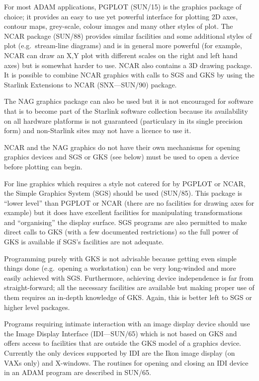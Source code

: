 For most ADAM applications, PGPLOT (SUN/15) is the graphics package of choice;
it provides an easy to use yet powerful interface for plotting 2D axes, contour 
maps, grey-scale, colour images and many other styles of plot. The NCAR
package (SUN/88) provides similar facilities and some additional styles of plot
(e.g.\ stream-line diagrams) and is in general more powerful (for example, NCAR
can draw an X,Y plot with different scales on the right and left hand axes) but
is somewhat harder to use. NCAR also contains a 3D drawing package. It
is possible to combine NCAR graphics with calls to SGS and GKS by using
the Starlink Extensions to NCAR (SNX---SUN/90) package.

The NAG graphics package can also be used but it is not encouraged for 
software that is to become part of the Starlink software collection because 
its availability on all hardware platforms is not guaranteed
(particulary in its single precision form) and non-Starlink sites may
not have a licence to use it.

NCAR and the NAG graphics do not have their own mechanisms for opening graphics
devices and SGS or GKS (see below) must be used to open a device before
plotting can begin.

For line graphics which requires a style not catered for by PGPLOT or NCAR, the
Simple Graphics System (SGS) should be used (SUN/85). This package is ``lower
level'' than PGPLOT or NCAR (there are no facilities for drawing axes for
example) but it does have excellent facilities for manipulating transformations
and ``organising'' the display surface. SGS programs are also permitted to make
direct calls to GKS (with a few documented restrictions) so the full power of
GKS is available if SGS's facilities are not adequate.

Programming purely with GKS is not advisable because getting even simple things
done (e.g.\ opening a workstation) can be very long-winded and more easily
achieved with SGS. Furthermore, achieving device independence is far from
straight-forward; all the necessary facilities are available but making proper
use of them requires an in-depth knowledge of GKS. Again, this is better left
to SGS or higher level packages.

Programs requiring intimate interaction with an image display device should use
the Image Display Interface (IDI---SUN/65) which is not based on GKS and offers
access to facilities that are outside the GKS model of a graphics device.
Currently the only devices supported by IDI are the Ikon image display (on VAXs
only) and X-windows. The routines for opening and closing an IDI device in an
ADAM program are described in SUN/65.


